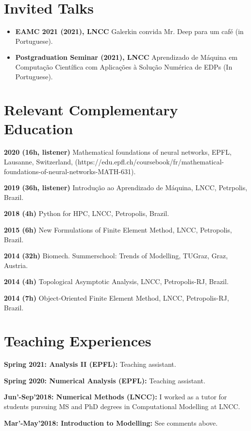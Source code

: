 \documentclass[letterpaper]{twentysecondcv} %
\begin{document}
\section{Invited Talks}
\begin{itemize}
\item \textbf{EAMC 2021 (2021), LNCC} Galerkin convida Mr. Deep para um café (in Portuguese).
\item \textbf{Postgraduation Seminar (2021), LNCC} Aprendizado de Máquina em Computação Científica com Aplicações à Solução Numérica de EDPs (In Portuguese).
\end{itemize}

\section{Relevant Complementary Education}
\item \textbf{2020 (16h, listener)} Mathematical foundations of neural networks, EPFL, Lausanne, Switzerland, (https://edu.epfl.ch/coursebook/fr/mathematical-foundations-of-neural-networks-MATH-631).
\item \textbf{2019 (36h, listener)} Introdução ao Aprendizado de Máquina, LNCC, Petrpolis, Brazil.
\item \textbf{2018 (4h)} Python for HPC, LNCC, Petropolis, Brazil.
\item \textbf{2015 (6h) } New Formulations of Finite Element Method, LNCC, Petropolis, Brazil.
\item \textbf{2014 (32h) } Biomech. Summerschool: Trends of Modelling, TUGraz, Graz, Austria.
\item \textbf{2014 (4h) } Topological Asymptotic Analysis, LNCC, Petropolis-RJ, Brazil. 
\item \textbf{2014 (7h) } Object-Oriented Finite Element Method, LNCC, Petropolis-RJ, Brazil.

\section{Teaching Experiences}
\item \textbf{Spring 2021: Analysis II (EPFL):} Teaching assistant.
\item \textbf{Spring 2020: Numerical Analysis (EPFL):} Teaching assistant.
\item \textbf{Jun'-Sep'2018: Numerical Methods (LNCC):} I worked as a tutor for students pursuing MS and PhD degrees in Computational Modelling at LNCC.

\item \textbf{Mar'-May'2018: Introduction to Modelling:} See comments above.
\end{document}
